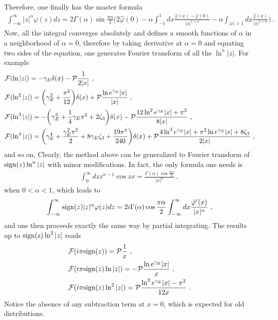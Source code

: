 \documentclass[a4paper,11pt]{article}
\begin{document}
Therefore, one finally has the master formula
\begin{align}\label{eq:FTeven}
\int_{-\infty}^{\infty} |z|^{\alpha} \varphi(z)dz=2\Gamma(\alpha)\sin \frac{\pi \alpha}{2}\bigg(2\hat \varphi(0)-\alpha\int_{-1}^{1}dx\frac{\hat \varphi(x)-\hat \varphi(0)}{|x|^{1+\alpha}}-\alpha\int_{|x|>1}dx\frac{\hat \varphi(x)}{|x|^{1+\alpha}}\bigg) \ .
\end{align}
Now, all the integral converges absolutely and defines a smooth functions of $\alpha$ in a neighborhood of $\alpha=0$, therefore by taking derivative at $\alpha=0$ and equating two sides of the equation, one generates Fourier transform of all the $\ln^n |z|$. For example
\begin{align}
&{\cal F}(\ln |z|)=-\gamma_E\delta(x)-{\cal P}\frac{1}{2|x|} \ , \\
&{\cal F}(\ln^2 |z|)=\bigg(\gamma_E^2+\frac{\pi^2}{12}\bigg)\delta(x)+{\cal P}\frac{\ln e^{\gamma_E}|x|}{|x|} \ , \\ 
&{\cal F}(\ln^3 |z|)=-\bigg(\gamma_E^3+\frac{1}{4}\gamma_E\pi^2+2\zeta_3\bigg)\delta(x)-{\cal P}\frac{12\ln^2 e^{\gamma_E}|x|+\pi^2}{8|x|} \ , \\ 
&{\cal F} (\ln^4 |z|)=\bigg(\gamma_E^4+\frac{\gamma_E^2\pi^2}{2}+8\gamma_E\zeta_3+\frac{19\pi^4}{240}\bigg)\delta(x)+{\cal P}\frac{4\ln^3 e^{\gamma_E}|x|+\pi^2\ln e^{\gamma_E} |x|+8\zeta_3}{2|x|} \ ,
\end{align}
and so on. Clearly, the method above can be generalized to Fourier transform of ${\rm sign}(z)\ln^n |z|$ with minor modifications. In fact, the only formula one needs is 
\begin{align}
\int_{0}^{\infty} dz z^{\alpha-1} \cos zx=\frac{\Gamma(\alpha)\cos \frac{\pi \alpha}{2}}{|x|^{\alpha}} \ ,
\end{align}
when $0<\alpha<1$, which leads to
\begin{align}\label{eq:FTodd}
\int_{-\infty}^{\infty} {\rm sign}(z)|z|^{\alpha} \varphi(z)dz=2i\Gamma(\alpha)\cos \frac{\pi \alpha}{2}\int_{-\infty}^{\infty} dx \frac{\hat \varphi'(x)}{|x|^{\alpha}} \ ,
\end{align}
and one then proceeds exactly the same way by partial integrating. The results up to ${\rm sign(z)}\ln^2 |z|$ reads
\begin{align}
&{\cal F}(i\pi {\rm sign}(z))={\cal P}\frac{1}{x} \ , \\
&{\cal F}(i\pi{\rm sign}(z)\ln |z|)=-{\cal P}\frac{\ln e^{\gamma_E} |x|}{x} \ , \\ 
&{\cal F}(i\pi {\rm sign}(z)\ln^2 |z|)={\cal P}\frac{\ln^2e^{\gamma_E}|x|-\pi^2}{12x} \ .
\end{align}
Notice the absence of any subtraction term at $x=0$, which is expected for old distributions. 
\end{document}
